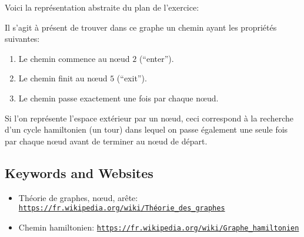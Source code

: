 \documentclass[a4paper,11pt]{report}
\newcommand{\BrochureUrlText}[1]{\texttt{#1}}
\newcommand{\taskGraphicsFolder}{..}
\begin{document}
\begin{samepage}
Voici la représentation abstraite du plan de l’exercice:

\nopagebreak

{\centering%
\par}
\end{samepage}

Il s’agit à présent de trouver dans ce graphe un chemin ayant les propriétés suivantes:

\begin{enumerate}
  \item Le chemin commence au nœud $2$ (“enter”).
  \item Le chemin finit au nœud $5$ (“exit”).
  \item Le chemin passe exactement une fois par chaque nœud.
\end{enumerate}

Si l’on représente l’espace extérieur par un nœud, ceci correspond à la recherche d’un cycle hamiltonien (un tour) dans lequel on passe également une seule fois par chaque nœud avant de terminer au nœud de départ.

{\centering%
\par}

{\raggedright

\subsection*{Keywords and Websites}

\begin{itemize}
  \item Théorie de graphes, nœud, arête: \href{https://fr.wikipedia.org/wiki/Th\%C3\%A9orie_des_graphes}{\BrochureUrlText{https://fr.wikipedia.org/wiki/Théorie\_des\_graphes}}
  \item Chemin hamiltonien: \href{https://fr.wikipedia.org/wiki/Graphe_hamiltonien}{\BrochureUrlText{https://fr.wikipedia.org/wiki/Graphe\_hamiltonien}}
\end{itemize}


}
\end{document}
